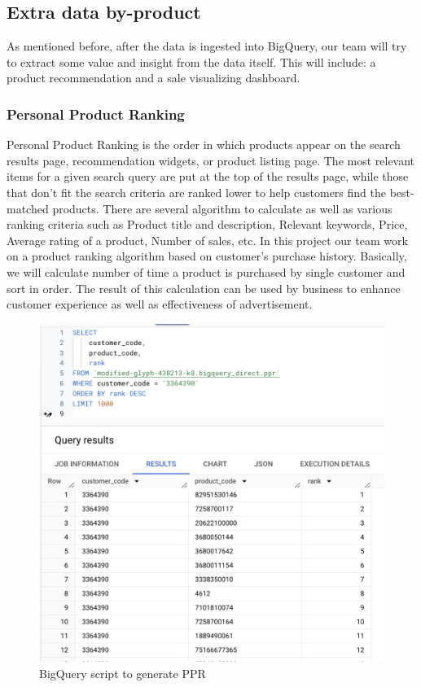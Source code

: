 \subsection{Extra data by-product}

As mentioned before, after the data is ingested into BigQuery, our team will try to extract some
value and insight from the data itself. This will include: a product recommendation and a sale
visualizing dashboard.

\subsubsection{Personal Product Ranking}
Personal Product Ranking is the order in which products appear on the search results page, recommendation widgets, or product listing page. The most relevant items for a given search query are put at the top of the results page, while those that don’t fit the search criteria are ranked lower to help customers find the best-matched products. There are several algorithm to calculate as well as various  ranking criteria such as Product title and description, Relevant keywords, Price, Average rating of a product, Number of sales, etc. In this project our team work on a product ranking  algorithm based on customer’s purchase history. Basically, we will calculate number of time a product is purchased by single customer and sort in order. The result of this calculation can be used by business to enhance customer experience as well as effectiveness of advertisement.
\begin{figure}[!htp]
    \centering
    \includegraphics[width=0.75\linewidth]{images/PPR.png}
    \caption{BigQuery script to generate PPR}
\end{figure}


